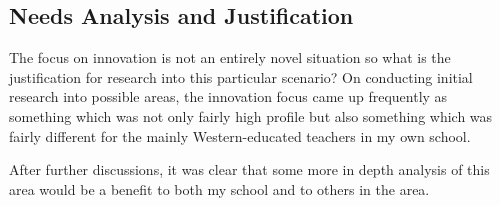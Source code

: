 \subsection{Needs Analysis and Justification}
The focus on innovation is not an entirely novel situation so what is the justification for research into this particular scenario? On conducting initial research into possible areas, the innovation focus came up frequently as something which was not only fairly high profile but also something which was fairly different for the mainly Western-educated teachers in my own school. 

After further discussions, it was clear that some more in depth analysis of this area would be a benefit to both my school and to others in the area.